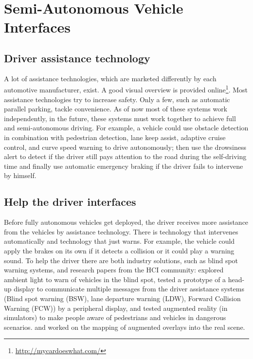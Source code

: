\section{Semi-Autonomous Vehicle Interfaces}
\subsection{Driver assistance technology}
A lot of assistance technologies, which are marketed differently by each automotive manufacturer, exist. A good visual overview is provided online\footnote{\url{http://mycardoeswhat.com/}}. Most assistance technologies try to increase safety. Only a few, such as automatic parallel parking, tackle convenience. As of now most of these systems work independently, in the future, these systems must work together to achieve full and semi-autonomous driving. For example, a vehicle could use obstacle detection in combination with pedestrian detection, lane keep assist, adaptive cruise control, and curve speed warning to drive autonomously; then use the drowsiness alert to detect if the driver still pays attention to the road during the self-driving time and finally use automatic emergency braking if the driver fails to intervene by himself. 

\subsection{Help the driver interfaces}
Before fully autonomous vehicles get deployed, the driver receives more assistance from the vehicles by assistance technology. There is technology that intervenes automatically and technology that just warns. For example, the vehicle could apply the brakes on its own if it detects a collision or it could play a warning sound. To help the driver there are both industry solutions, such as blind spot warning systems, and research papers from the HCI community:  \citet{Loecken2015} explored ambient light to warn of vehicles in the blind spot, \citet{Langlois2013} tested a prototype of a head-up display to communicate multiple messages from the driver assistance systems (Blind spot warning (BSW), lane departure warning (LDW), Forward Collision Warning (FCW)) by a peripheral display, \citet{Kim} and \citet{Langlois2016} tested augmented reality (in simulators) to make people aware of pedestrians and vehicles in dangerous scenarios. 
\citet{Larnaout2013} and \citet{Abdi} worked on the mapping of augmented overlays into the real scene. 

